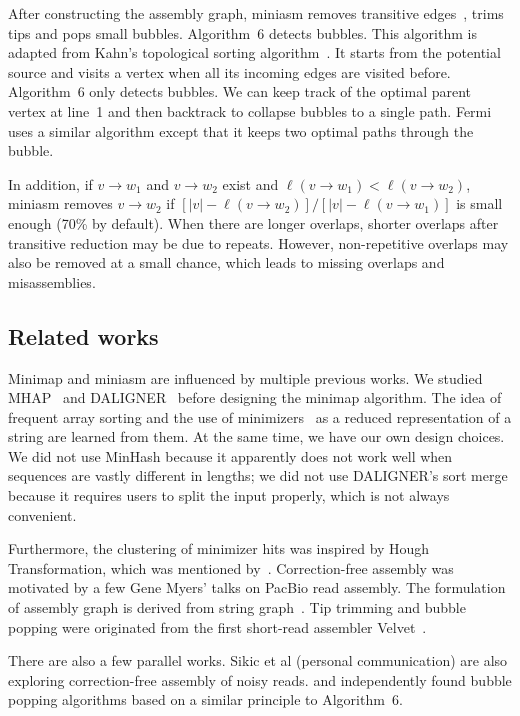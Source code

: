 \documentclass{bioinfo}
\begin{document}
\begin{methods}
After constructing the assembly graph, miniasm removes transitive
edges~\citep{Myers:2005bh}, trims tips and pops small bubbles. Algorithm~6
detects bubbles. This algorithm is adapted from Kahn's topological sorting
algorithm~\citep{Kahn62aa}. It starts from the potential source and visits a
vertex when all its incoming edges are visited before. Algorithm~6 only detects
bubbles. We can keep track of the optimal parent vertex at line~1 and then
backtrack to collapse bubbles to a single path. Fermi~\citep{Li:2012fk} uses a
similar algorithm except that it keeps two optimal paths through the bubble.

In addition, if $v\to w_1$ and $v\to w_2$ exist and $\ell(v\to w_1)<\ell(v\to
w_2)$, miniasm removes $v\to w_2$ if $[|v|-\ell(v\to w_2)]/[|v|-\ell(v\to
w_1)]$ is small enough (70\% by default). When there are longer overlaps,
shorter overlaps after transitive reduction may be due to repeats.
However, non-repetitive overlaps may also be removed at a small chance, which
leads to missing overlaps and misassemblies.

\subsection{Related works}

Minimap and miniasm are influenced by multiple previous works. We studied 
MHAP~\citep{Berlin:2015xy} and DALIGNER~\citep{DBLP:conf/wabi/Myers14} before
designing the minimap algorithm. The idea of frequent array sorting and the use
of minimizers~\citep{Roberts:2004fv} as a reduced representation of a string
are learned from them. At the same time, we have our own design choices. We did
not use MinHash because it apparently does not work well when sequences are
vastly different in lengths; we did not use DALIGNER's sort merge because it
requires users to split the input properly, which is not always convenient.

Furthermore, the clustering of minimizer hits was inspired by Hough
Transformation, which was mentioned by~\citet{sovic:2015aa}. Correction-free
assembly was motivated by a few Gene Myers' talks on PacBio read assembly. The
formulation of assembly graph is derived from string
graph~\citep{Myers:2005bh}. Tip trimming and bubble popping were originated
from the first short-read assembler Velvet~\citep{Zerbino:2008uq}.

There are also a few parallel works. Sikic et al (personal communication) are
also exploring correction-free assembly of noisy reads.
\citet{DBLP:conf/wabi/OnoderaSS13} and \citet{TCS15} independently found bubble
popping algorithms based on a similar principle to Algorithm~6.

\end{methods}


\end{document}
